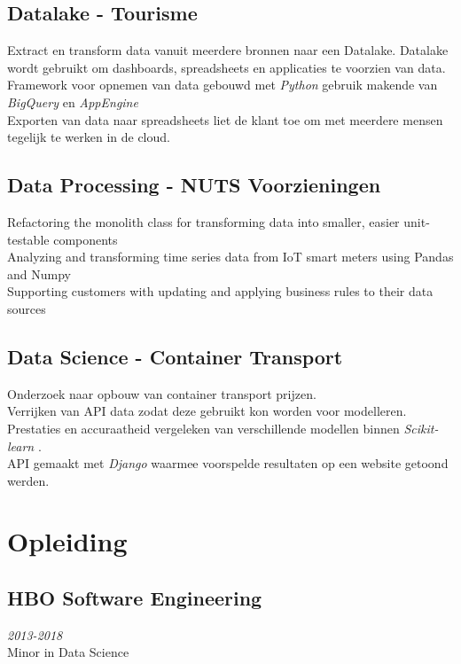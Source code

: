 \documentclass{article}
\begin{document}
\subsection{Datalake - Tourisme}
Extract en transform data vanuit meerdere bronnen naar een Datalake. Datalake wordt gebruikt om dashboards, spreadsheets en applicaties te voorzien van data. \\
Framework voor opnemen van data gebouwd met \emph{Python} gebruik makende van \emph{BigQuery} en \emph{AppEngine} \\
Exporten van data naar spreadsheets liet de klant toe om met meerdere mensen tegelijk te werken in de cloud.

\subsection{Data Processing - NUTS Voorzieningen}
Refactoring the monolith class for transforming data into smaller, easier unit-testable components \\
Analyzing and transforming time series data from IoT smart meters using Pandas and Numpy \\
Supporting customers with updating and applying business rules to their data sources \\

\subsection{Data Science - Container Transport}
Onderzoek naar opbouw van container transport prijzen. \\
Verrijken van API data zodat deze gebruikt kon worden voor modelleren. \\
Prestaties en accuraatheid vergeleken van verschillende modellen binnen \emph{Scikit-learn} . \\
API gemaakt met \emph{Django} waarmee voorspelde resultaten op een website getoond werden. \\

\clearpage

\section{Opleiding}
\subsection{HBO Software Engineering}\hfill {\em 2013-2018} \\
Minor in Data Science
\end{document}
